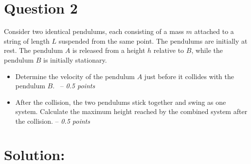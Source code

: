 \section*{Question 2}
Consider two identical pendulums, each consisting of a mass $m$ attached to a string of length $L$ suspended from the same point. The pendulums are initially at rest. The pendulum $A$ is released from a height $h$ relative to $B$, while the pendulum $B$ is initially stationary.

\begin{itemize}
    \item [\textbf{(a)}] Determine the velocity of the pendulum $A$ just before it collides with the pendulum $B$. ~-- \textit{0.5 points}
    \item [\textbf{(b)}] After the collision, the two pendulums stick together and swing as one system. Calculate the maximum height reached by the combined system after the collision. -- \textit{0.5 points}
\end{itemize}

\section*{Solution:}